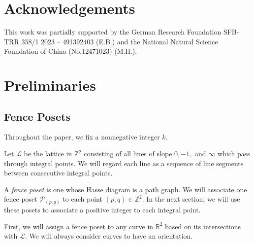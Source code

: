 \documentclass{article}
\theoremstyle{remark}
\newcommand{\calP}{\mathcal{P}}
\begin{document}
\section*{Acknowledgements}
This work was partially supported by the German Research Foundation SFB-TRR 358/1 2023 – 491392403 (E.B.) and the National Natural Science Foundation
of China (No.12471023) (M.H.). 

\section{Preliminaries}\label{sec:Preliminaries}

\subsection{Fence Posets}

Throughout the paper, we fix a nonnegative integer $k$. 

Let $\mathcal{L}$ be the lattice in $\mathbb{Z}^2$ consisting of all lines of slope $0,-1,$ and $\infty$ which pass through integral points. We will regard each line as a sequence of line segments between consecutive integral points. 

A \emph{fence poset} is one whose Hasse diagram is a path graph. We will associate one fence poset $\calP_{(p,q)}$ to each point $(p,q) \in \mathbb{Z}^2$. In the next section, we will use these posets to associate a positive integer to each integral point.

First, we will assign a fence poset to any curve in $\mathbb{R}^2$ based on its intersections with $\mathcal{L}$. We will always consider curves to have an orientation.
\end{document}
